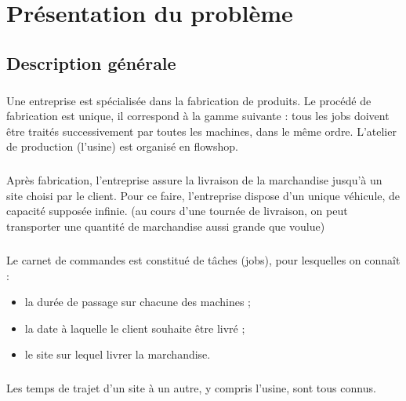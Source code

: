 \chapter{Présentation du problème}


\section{Description générale}

\paragraph{}
Une entreprise est spécialisée dans la fabrication de produits. Le procédé de fabrication est unique, il correspond à la gamme suivante :
tous les jobs doivent être traités successivement par toutes les machines, dans le même ordre.
L’atelier de production (l’usine) est organisé en flowshop.

\paragraph{}
Après fabrication, l’entreprise assure la livraison de la marchandise jusqu’à un site choisi par le client. Pour ce faire, l’entreprise dispose d’un unique véhicule, de capacité supposée infinie. (au cours d’une tournée de livraison, on peut transporter une quantité de marchandise aussi grande que voulue)

\paragraph{}
Le carnet de commandes est constitué de tâches (jobs), pour lesquelles on connaît :
\begin{itemize}
\item la durée de passage sur chacune des machines ;
\item la date à laquelle le client souhaite être livré ;
\item le site sur lequel livrer la marchandise.
\end{itemize}

\paragraph{}
Les temps de trajet d’un site à un autre, y compris l’usine, sont tous connus.

